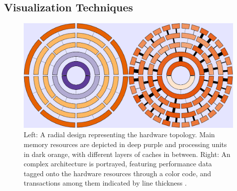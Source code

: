 \subsection{Visualization Techniques}\label{sec:visualization}
\begin{figure}
	\centering
	\includegraphics[width=\linewidth]{pictures/memaxes_cache.png}
	\caption{Left: A radial design representing the hardware topology. Main memory resources are depicted in deep purple and processing units in dark orange, with different layers of caches in between. Right: An complex architecture is portrayed, featuring performance data tagged onto the hardware resources through a color code, and transactions among them indicated by line thickness \cite{gimenez2017memaxes}.}
	\label{fig:memaxes_cache}
\end{figure}

